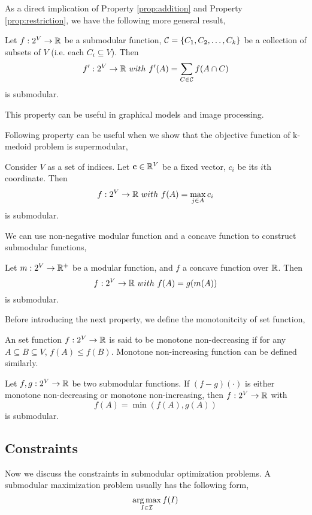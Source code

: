 As a direct implication of Property \ref{prop:addition} and Property \ref{prop:restriction}, we have the following more general result,
\begin{property}
Let $f:2^V \rightarrow \mathbb{R}$ be a submodular function, $\mathcal{C} = \{C_1, C_2, \ldots, C_k\}$ be a collection of subsets of $V$ (i.e. each $C_i \subseteq V$). Then
$$f':2^V \rightarrow \mathbb{R}~{with}~f'(A) = \sum_{C\in\mathcal{C}}f(A\cap C)$$ 
is submodular.
\end{property}
This property can be useful in graphical models and image processing. 


Following property can be useful when we show that the objective function of k-medoid problem is supermodular,
\begin{property}
  \label{prop:max}
Consider $V$ as a set of indices. Let $\mathbf{c}\in \mathbb{R}^V$ be a fixed vector, $c_i$ be its $i$th coordinate. Then 
$$f:2^V \rightarrow \mathbb{R}~{with}~ f(A) = \max_{j\in A}c_i$$ 
is submodular.
\end{property}

We can use non-negative modular function and a concave function to construct submodular functions,
\begin{property}
  Let $m: 2^V \rightarrow \mathbb{R}^+$ be a modular function, and $f$ a concave function over $\mathbb{R}$. Then
$$f: 2^V \rightarrow \mathbb{R} ~{with}~ f(A) = g(m(A))$$
is submodular.
\end{property}

Before introducing the next property, we define the monotonitcity of set function,
\begin{definition}[Monotonitcity]
  An set function $f: 2^V \rightarrow  \mathbb{R}$ is said to be monotone non-decreasing if for any $A\subseteq B \subseteq V$, $f(A) \leq f(B)$. Monotone non-increasing function can be defined similarly.
\end{definition}

\begin{property}
  Let $f, g: 2^V \rightarrow \mathbb{R}$ be two submodular functions. If $(f - g)(\cdot)$ is either monotone non-decreasing or monotone non-increasing, then $f: 2^V \rightarrow \mathbb{R}$ with
$$f(A) = \min(f(A), g(A))$$
is submodular.
\end{property}



\subsection{Constraints}
Now we discuss the constraints in submodular optimization problems. A submodular maximization problem usually has the following form,
\begin{equation}
  \label{eq:optimization}
  \operatorname*{arg\,max}_{I\in\mathcal{I}} f(I)
\end{equation}

